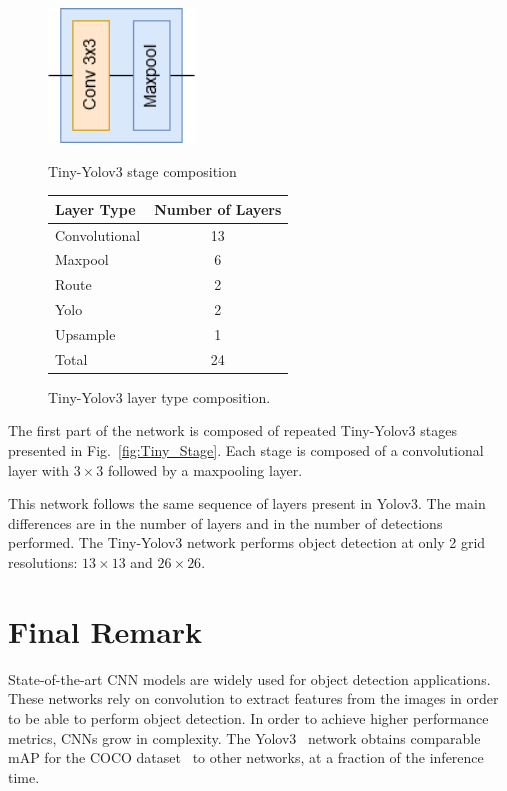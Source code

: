 \begin{figure}[!htb]
	\begin{minipage}[b]{0.5\linewidth}
		\centering
		\includegraphics[width=0.35\textwidth]{Figures/TinyStage.png}
		\caption{Tiny-Yolov3 stage composition}
		\label{fig:Tiny_Stage}
	\end{minipage}%
	\begin{minipage}[b]{0.5\linewidth}
		\centering
		\begin{tabular}{lc}
			\toprule
			Layer Type           & Number of Layers  \\
			\midrule
			Convolutional       & 13    \\
			Maxpool  			& 6     \\
			Route 			    & 2     \\
			Yolo  				& 2     \\
			Upsample 		    & 1     \\
			Total 				& 24 \\
			\bottomrule
			
		\end{tabular}
		\caption[Table caption shown in TOC.]{Tiny-Yolov3 layer type composition.}
		\label{tab:yolov3_tiny_num_layers}
	\end{minipage}
\end{figure}

The first part of the network is composed of repeated Tiny-Yolov3 stages
presented in Fig.~\ref{fig:Tiny_Stage}. Each stage is composed of a
convolutional layer with $3\times3$ followed by a maxpooling layer.

This network follows the same sequence of layers present in Yolov3. The main
differences are in the number of layers and in the number of detections
performed. The Tiny-Yolov3 network performs object detection at only 2 grid
resolutions: $13\times13$ and $26\times26$.

\section*{Final Remark}
State-of-the-art CNN models are widely used for object detection
applications. These networks rely on convolution to extract features from the
images in order to be able to perform object detection. In order to achieve
higher performance metrics, CNNs grow in complexity. The Yolov3~\cite{yolov3}
network obtains comparable mAP for the COCO dataset~\cite{coco:Microsoft} to
other networks, at a fraction of the inference time.



